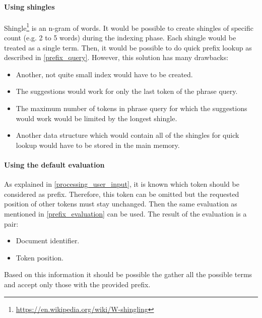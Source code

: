 \paragraph{Using shingles}
Shingle\footnote{\url{https://en.wikipedia.org/wiki/W-shingling}} is an n-gram of words. It would be possible to create
shingles of specific count (e.g. 2 to 5 words) during the indexing phase. Each shingle would be treated as a single term.
Then, it would be possible to do quick prefix lookup as described in \ref{prefix_query}. However, this solution has many drawbacks:
\begin{itemize}
    \item Another, not quite small index would have to be created.
    \item The suggestions would work for only the last token of the phrase query.
    \item The maximum number of tokens in phrase query for which the suggestions would work would be limited by the longest
    shingle.
    \item Another data structure which would contain all of the shingles for quick lookup would have to be stored in the
    main memory.
\end{itemize}

\paragraph{Using the default evaluation}
As explained in \ref{processing_user_input}, it is known which token should be considered as prefix. Therefore, this token
can be omitted but the requested position of other tokens must stay unchanged. Then the same evaluation as mentioned in
\ref{prefix_evaluation} can be used. The result of the evaluation is a pair:
\begin{itemize}
    \item Document identifier.
    \item Token position.
\end{itemize}
Based on this information it should be possible the gather all the possible terms and accept only those with the
provided prefix.

